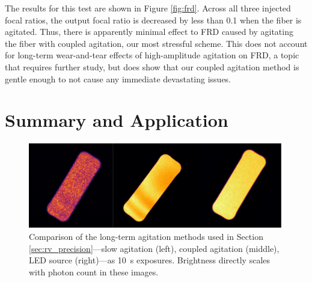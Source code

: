 The results for this test are shown in Figure {\ref{fig:frd}}. Across all three injected focal ratios, the output focal ratio is decreased by less than 0.1 when the fiber is agitated. Thus, there is apparently minimal effect to FRD caused by agitating the fiber with coupled agitation, our most stressful scheme. This does not account for long-term wear-and-tear effects of high-amplitude agitation on FRD, a topic that requires further study, but does show that our coupled agitation method is gentle enough to not cause any immediate devastating issues.

\section{Summary and Application}
\label{sec:conclusions}

\begin{figure}
\centering
	\includegraphics[width=\columnwidth]{figures-2/fiber_rv_error.pdf}
	\caption[Comparison of long-term agitation methods]{Comparison of the long-term agitation methods used in Section \ref{sec:rv_precision}---slow agitation (left), coupled agitation (middle), LED source (right)---as \SI{10}{\second} exposures. Brightness directly scales with photon count in these images.}
\label{fig:fiber_rv_error}
\end{figure}

